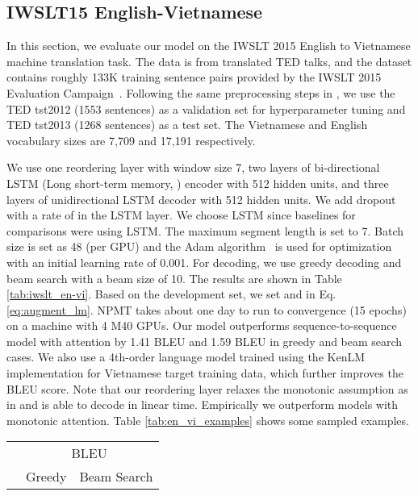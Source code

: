 \documentclass{article}
\begin{document}
{\subsection{IWSLT15 English-Vietnamese}
In this section, we evaluate our model on the IWSLT 2015 English to Vietnamese
machine translation task.
The data is from translated TED talks, and the dataset contains roughly 133K
training sentence pairs provided by the IWSLT 2015 Evaluation
Campaign~\citep{cettolo2015iwslt}.  Following the same preprocessing steps in
\cite{luong_mt_2015,raffel2017online}, we use the TED tst2012 (1553 sentences)
as a validation set for hyperparameter tuning and TED tst2013 (1268 sentences)
as a test set.
The Vietnamese and English vocabulary sizes are 7,709 and 17,191 respectively.

We use one reordering layer with window size 7, two layers of bi-directional LSTM (Long
short-term memory, \cite{Hochreiter:1997}) encoder with 512 hidden units, and
three layers of unidirectional LSTM decoder with 512 hidden units.  We add dropout with a
rate of  in the LSTM layer. We choose LSTM since baselines for comparisons
were using LSTM. The maximum segment length is set to 7.  Batch size is set as 48 (per GPU)
and the Adam algorithm~\cite{kingma2014adam} is used for optimization with an
initial learning rate of 0.001. For decoding, we use greedy decoding and beam
search with a beam size of 10. The results are shown in Table
\ref{tab:iwslt_en-vi}.  Based on the development set, we set  and
 in Eq. \eqref{eq:augment_lm}.  
NPMT takes about one day to run to convergence (15 epochs) on a machine with 4 M40 GPUs. 
Our model outperforms sequence-to-sequence model with attention by 1.41 BLEU and 1.59 BLEU in greedy
and beam search cases.  We also use a 4th-order language model trained using the KenLM
implementation for Vietnamese target training data,
which further improves the BLEU score. Note that our reordering layer relaxes
the monotonic assumption as in \cite{raffel2017online} and is able to decode in
linear time. Empirically we outperform models with monotonic attention.  Table
\ref{tab:en_vi_examples} shows some sampled examples. 
\begin{table}[h!]
	\centering
	\begin{tabular}{lcc}
		\toprule		
		& \multicolumn{2}{c}{BLEU } \\ 
		&  Greedy & Beam Search \\ 	
		\midrule



\end{tabular}
\end{table}}
\end{document}
